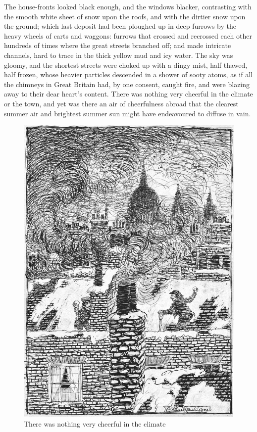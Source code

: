 \documentclass[paper=5.5in:8.5in,BCOR=7mm,twoside,DIV=calc,12pt,usegeometry]{scrbook} %
\begin{document}
The house-fronts looked black enough, and the windows black\-er, contrasting with the smooth white sheet of snow upon the roofs, and with the dirtier snow upon the ground; which last deposit had been ploughed up in deep furrows by the heavy wheels of carts and waggons: furrows that crossed and recrossed each other hundreds of times where the great streets branched off; and made intricate channels, hard to trace in the thick yellow mud and icy water. The sky was gloomy, and the shortest streets were choked up with a dingy mist, half thawed, half frozen, whose heavier particles descended in a shower of sooty atoms, as if all the chimneys in Great Britain had, by one consent, caught fire, and were blazing away to their dear heart's content. There was nothing very cheerful in the climate or the town, and yet was there an air of cheerfulness abroad that the clearest summer air and brightest summer sun might have endeavoured to diffuse in vain.

\begin{figure}
\begin{minipage}[c]{\linewidth}
\includegraphics[width=\linewidth]{climate}
\caption*{There was nothing very cheerful in the climate}
\end{minipage}
\end{figure}
\end{document}

